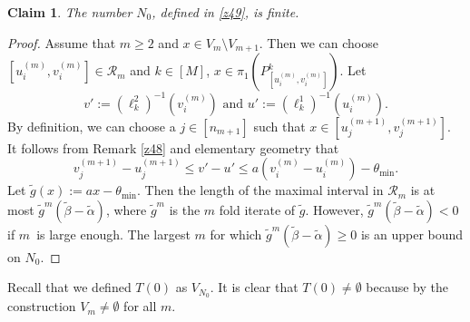 \documentclass[amssymb,amsfonts,12pt,verbatim,righttag,oneside]{amsart}
\numberwithin{equation}{section} %
\theoremstyle{plain}
\newcommand{\fma}{\ensuremath{\,}}
\theoremstyle{plain}
\newtheorem{claim}[theorem]{Claim}
\begin{document}
\begin{claim}\label{z15}
The number $N_0  $, defined in \eqref{z49}, is finite.
\end{claim}
\begin{proof}
Assume that $m\geq 2$ and $x\in V_m\setminus V_{m+1}$. Then we can choose
$\left[ u _{i}^{(m) },v _{i}^{(m) } \right]\in\mathcal{R}_m$ and $k\in[M]$,
$x\in\pi _1\left( P _{ \left[ u _{i}^{(m) },v _{i}^{(m) } \right]  }^{k }\right)$. Let
$$
v':=(\ell  _{k}^{2 })^{-1}(v^{(m)}_i) \text{ and }
u':=(\ell _{k}^{1})^{-1}(u_i^{(m)}).
$$
By definition, we can choose a $j\in[n_{m+1}]$ such that
$x\in \left[ u _{j}^{(m+1) },v _{j}^{(m+1) } \right]$. It follows from
Remark \ref{z48} and elementary geometry that
\begin{equation}
\label{z47}
v _{j}^{(m+1) }- u _{j}^{(m+1) } \leq v'-u' \leq
a\left( v _{i}^{(m) }-u _{i}^{(m) } \right)-\theta_{\min}.
\end{equation}
Let $\widetilde{g}(x):= ax-\theta_{\min}$. Then the length of the maximal interval in $\mathcal{R}_m$ is at most
$\widetilde{g}^m(\widetilde{\beta }-\widetilde{\alpha })$, where $\widetilde{g}^m$ is the $m$  fold iterate of $\widetilde{g}$.
However, $\widetilde{g}^m(\widetilde{\beta }-\widetilde{\alpha })<0$  if $m$ \fma is large enough.
The largest $m$ for which $\widetilde{g}^m(\widetilde{\beta }-\widetilde{\alpha })\geq 0$ is an upper bound on $N_0$.
\end{proof}






Recall that we defined $T(0)$ as $V_{N_0}$. It is clear that
$T(0)\ne \emptyset $ because by the construction $V_m\ne \emptyset $ for all $m$.
\end{document}
